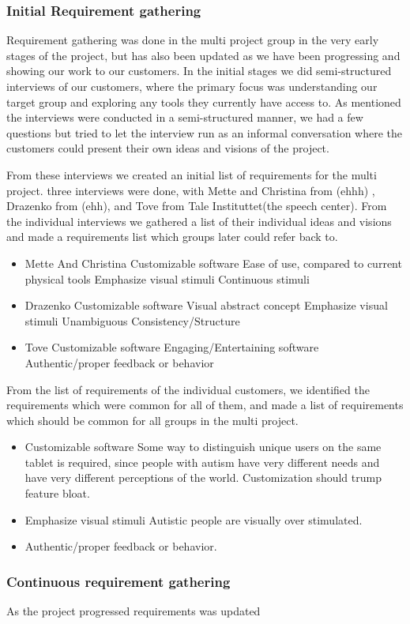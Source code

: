 \subsubsection{Initial Requirement gathering}
Requirement gathering was done in the multi project group in the very early stages of the project, but has also been updated as we have been progressing and showing our work to our customers.
In the initial stages we did semi-structured interviews of our customers, where the primary focus was understanding our target group and exploring any tools they currently have access to.
As mentioned the interviews were conducted in a semi-structured manner, we had a few questions%
but tried to let the interview run as an informal conversation where the customers could present their own ideas and visions of the project.

From these interviews we created an initial list of requirements for the multi project.
three interviews were done, with Mette and Christina from (ehhh) , Drazenko from (ehh), and Tove from Tale Instituttet(the speech center).
From the individual interviews we gathered a list of their individual ideas and visions and made a requirements list which groups later could refer back to.

\begin{itemize}
 \item Mette And Christina 
  \subitem Customizable software
  \subitem Ease of use, compared to current physical tools
  \subitem Emphasize visual stimuli
  \subitem Continuous stimuli 
 \item Drazenko
  \subitem Customizable software
  \subitem Visual abstract concept
  \subitem Emphasize visual stimuli
  \subitem Unambiguous
  \subitem Consistency/Structure
 \item Tove 
  \subitem Customizable software
  \subitem Engaging/Entertaining software
  \subitem Authentic/proper feedback or behavior
\end{itemize}

From the list of requirements of the individual customers, we identified the requirements which were common for all of them, and made a list of requirements which
should be common for all groups in the multi project.

\begin{itemize}
 \item Customizable software
  \subitem Some way to distinguish unique users on the same tablet is required, since people with autism have very different needs and have very different perceptions of the world.
  \subitem Customization should trump feature bloat.
 \item Emphasize visual stimuli
  \subitem Autistic people are visually over stimulated.
 \item Authentic/proper feedback or behavior.
\end{itemize}

\subsubsection{Continuous requirement gathering}
As the project progressed requirements was updated